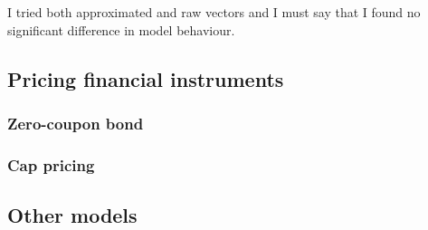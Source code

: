 \documentclass[11pt]{article} %
\begin{document}
I tried both approximated and raw vectors and I must say that I found no significant difference in model behaviour.

\subsection{Pricing financial instruments}

\subsubsection{Zero-coupon bond}

\subsubsection{Cap pricing}

\subsection{Other models}



\end{document}
